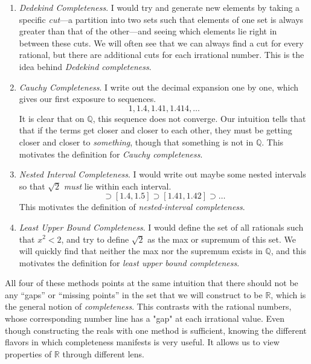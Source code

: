   \begin{enumerate}
    \item \textit{Dedekind Completeness}. I would try and generate new elements by taking a specific \textit{cut}---a partition into two sets such that elements of one set is always greater than that of the other---and seeing which elements lie right in between these cuts. We will often see that we can always find a cut for every rational, but there are additional cuts for each irrational number. This is the idea behind \textit{Dedekind completeness}. 

    \item \textit{Cauchy Completeness}. I write out the decimal expansion one by one, which gives our first exposure to sequences. 
    \begin{equation}
      1, 1.4, 1.41, 1.414, \ldots
    \end{equation} 
    It is clear that on $\mathbb{Q}$, this sequence does not converge. Our intuition tells that that if the terms get closer and closer to each other, they must be getting closer and closer to \textit{something}, though that something is not in $\mathbb{Q}$. This motivates the definition for \textit{Cauchy completeness}. 

    \item \textit{Nested Interval Completeness}. I would write out maybe some nested intervals so that $\sqrt{2}$ \textit{must} lie within each interval. 
    \begin{equation}
      [1, 2] \supset [1.4, 1.5] \supset [1.41, 1.42] \supset \ldots 
    \end{equation}
    This motivates the definition of \textit{nested-interval completeness}. 

    \item \textit{Least Upper Bound Completeness}. I would define the set of all rationals such that $x^2 < 2$, and try to define $\sqrt{2}$ as the max or supremum of this set. We will quickly find that neither the max nor the supremum exists in $\mathbb{Q}$, and this motivates the definition for \textit{least upper bound completeness}. 
  \end{enumerate}

  All four of these methods points at the same intuition that there should not be any ``gaps'' or ``missing points'' in the set that we will construct to be $\mathbb{R}$, which is the general notion of \textit{completeness}. This contrasts with the rational numbers, whose corresponding number line has a "gap" at each irrational value. Even though constructing the reals with one method is sufficient, knowing the different flavors in which completeness manifests is very useful. It allows us to view properties of $\mathbb{R}$ through different lens. 

